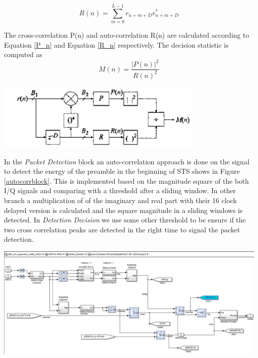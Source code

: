 \begin{equation} \label{R_n}
 R(n) = \sum\limits_{m=0}^{L-1} r_{n+m+D} r^{*}_{n+m+D}
\end{equation}

The cross-correlation P(n) and auto-correlation R(n) are calculated according to Equation \ref{P_n} and Equation \ref{R_n} respectively. The decision statistic is computed as\\

\begin{equation} \label{M_n}
M(n)= \dfrac{|P(n)|^{2}}{R(n)^{2}}
\end{equation}


\begin{center}
\includegraphics[width=10cm]{content/fig/schimdl_cox.JPG}
\label{schimdl_cox}
\end{center}

In the \textit{Packet Detection} block an auto-correlation approach is done on the signal to detect the energy of the preamble in the beginning of STS shows in Figure \ref{autocorrblock}. This is implemented based on the magnitude square of the both I/Q signals and comparing with a threshold after a sliding window. In other branch a multiplication of of the imaginary and real part with their 16 clock delayed version is calculated and the square magnitude in a sliding windows is detected. In \textit{Detection Decision} we use some other threshold to be ensure if the two cross correlation peaks are detected in the right time to signal the packet detection.

\begin{center}
\includegraphics[width=\textwidth]{content/fig/autocorrblock.JPG}
\label{autocorrblock}
\end{center}

